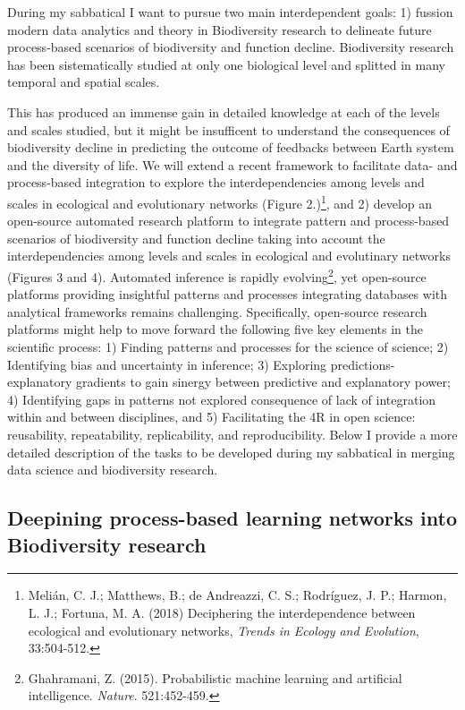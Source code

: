 \documentclass[authoryear,1p,12pt]{elsarticle}
\begin{document}
During my sabbatical I want to pursue two main interdependent goals: 1) fussion
modern data analytics and theory in Biodiversity research to delineate
future process-based scenarios of biodiversity and function
decline. Biodiversity research has been sistematically studied at only
one biological level and splitted in many temporal and spatial scales.

\pagebreak

This has produced an immense gain in detailed knowledge at each of the
levels and scales studied, but it might be insufficent to understand
the consequences of biodiversity decline in predicting the outcome of
feedbacks between Earth system and the diversity of life. We will
extend a recent framework to facilitate data- and process-based
integration to explore the interdependencies among levels and scales
in ecological and evolutionary networks (Figure 2.)\footnote{Melián,
  C. J.; Matthews, B.; de Andreazzi, C. S.; Rodríguez, J. P.; Harmon,
  L. J.; Fortuna, M. A. (2018) Deciphering the interdependence between
  ecological and evolutionary networks, {\em Trends in Ecology and
    Evolution}, 33:504-512.}, and 2) develop an open-source automated
research platform to integrate pattern and process-based scenarios of
biodiversity and function decline taking into account the
interdependencies among levels and scales in ecological and
evolutinary networks (Figures 3 and 4). Automated inference is rapidly
evolving\footnote{Ghahramani, Z. (2015). Probabilistic machine
  learning and artificial intelligence. {\em Nature}. 521:452-459.},
yet open-source platforms providing insightful patterns and processes
integrating databases with analytical frameworks remains
challenging. Specifically, open-source research platforms might help
to move forward the following five key elements in the scientific
process: 1) Finding patterns and processes for the science of science;
2) Identifying bias and uncertainty in inference; 3) Exploring
predictions-explanatory gradients to gain sinergy between predictive
and explanatory power; 4) Identifying gaps in patterns not explored
consequence of lack of integration within and between disciplines, and
5) Facilitating the 4R in open science: reusability, repeatability,
replicability, and reproducibility. Below I provide a more detailed
description of the tasks to be developed during my sabbatical in
merging data science and biodiversity research.

\subsection{{\bf Deepining process-based learning networks into Biodiversity research}}
\end{document}
